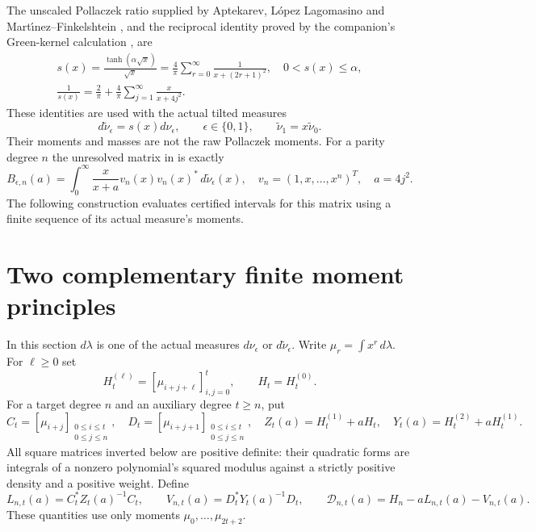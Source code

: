 \documentclass[11pt]{article}
\begin{document}
The unscaled Pollaczek ratio supplied by Aptekarev, L\'opez Lagomasino
and Mart\'{\i}nez--Finkelshtein \cite{ALM}, and the reciprocal identity
proved by the companion's Green-kernel calculation \cite{PP}, are
\begin{equation}\label{eq:s}
 \begin{gathered}
 s(x)=\frac{\tanh(\alpha\sqrt x)}{\sqrt x}
 =\frac4\pi\sum_{r=0}^\infty\frac1{x+(2r+1)^2},
 \quad0<s(x)\le\alpha,\\
 \frac1{s(x)}=\frac2\pi+\frac4\pi
       \sum_{j=1}^\infty\frac{x}{x+4j^2}.
 \end{gathered}
\end{equation}
These identities are used with the actual tilted measures
\begin{equation}\label{eq:tilts}
 d\widetilde\nu_\epsilon=s(x)d\nu_\epsilon,
 \qquad\epsilon\in\{0,1\},
 \qquad\widetilde\nu_1=x\widetilde\nu_0.
\end{equation}
Their moments and masses are not the raw Pollaczek moments.  For a
parity degree $n$ the unresolved matrix in \cite{TR} is exactly
\begin{equation}\label{eq:target}
 B_{\epsilon,n}(a)=\int_0^\infty
 \frac{x}{x+a}v_n(x)v_n(x)^*\,d\widetilde\nu_\epsilon(x),
 \quad v_n=(1,x,\ldots,x^n)^T,\quad a=4j^2.
\end{equation}
The following construction evaluates certified intervals for this
matrix using a finite sequence of its actual measure's moments.

\section{Two complementary finite moment principles}

In this section $d\lambda$ is one of the actual measures
$d\nu_\epsilon$ or $d\widetilde\nu_\epsilon$.  Write
$\mu_r=\int x^r\,d\lambda$.  For $\ell\ge0$ set
\[
 H_t^{(\ell)}=[\mu_{i+j+\ell}]_{i,j=0}^t,
 \qquad H_t=H_t^{(0)}.
\]
For a target degree $n$ and an auxiliary degree $t\ge n$, put
\begin{equation}\label{eq:rectangular}
 C_t=[\mu_{i+j}]_{\substack{0\le i\le t\\0\le j\le n}},
 \quad D_t=[\mu_{i+j+1}]_{\substack{0\le i\le t\\0\le j\le n}},
 \quad Z_t(a)=H_t^{(1)}+aH_t,
 \quad Y_t(a)=H_t^{(2)}+aH_t^{(1)}.
\end{equation}
All square matrices inverted below are positive definite: their
quadratic forms are integrals of a nonzero polynomial's squared
modulus against a strictly positive density and a positive weight.
Define
\begin{equation}\label{eq:variational}
 L_{n,t}(a)=C_t^*Z_t(a)^{-1}C_t,
 \qquad V_{n,t}(a)=D_t^*Y_t(a)^{-1}D_t,
 \qquad\mathcal D_{n,t}(a)=H_n-aL_{n,t}(a)-V_{n,t}(a).
\end{equation}
These quantities use only moments $\mu_0,\ldots,\mu_{2t+2}$.
\end{document}
